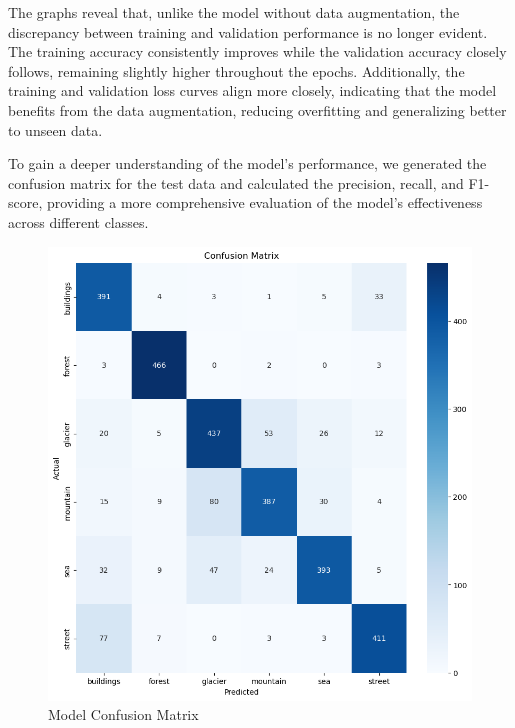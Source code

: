 The graphs reveal that, unlike the model without data augmentation, the discrepancy between training and validation performance is no longer evident. The training accuracy consistently improves while the validation accuracy closely follows, remaining slightly higher throughout the epochs. Additionally, the training and validation loss curves align more closely, indicating that the model benefits from the data augmentation, reducing overfitting and generalizing better to unseen data.

To gain a deeper understanding of the model's performance, we generated the confusion matrix for the test data and calculated the precision, recall, and F1-score, providing a more comprehensive evaluation of the model's effectiveness across different classes.

\begin{figure}[H]
    \centering
    \includegraphics[width=1\linewidth]{images/modelos_aula_confusion_dataaug.png}
    \caption{Model Confusion Matrix}
    \label{fig:enter-label}
\end{figure}

